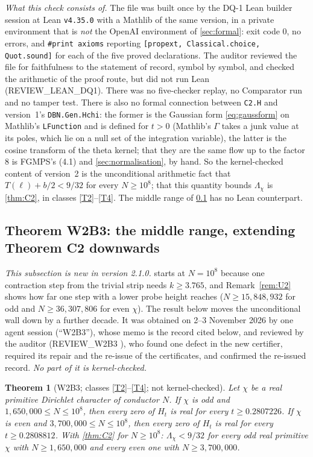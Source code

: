 \documentclass[11pt]{article}
\newtheorem{theorem}{Theorem}[section]
\theoremstyle{definition}
\newcommand{\lean}[1]{\texttt{#1}}
\newcommand{\Lc}{\Lambda}
\begin{document}
\emph{What this check consists of.} The file was built once by the DQ-1 Lean builder session at Lean \lean{v4.35.0} with a Mathlib of the same version, in a private environment that is \emph{not} the OpenAI environment of \cref{sec:formal}: exit code $0$, no errors, and \lean{\#print axioms} reporting \lean{[propext, Classical.choice, Quot.sound]} for each of the five proved declarations. The auditor reviewed the file for faithfulness to the statement of record, symbol by symbol, and checked the arithmetic of the proof route, but did not run Lean (REVIEW\_LEAN\_DQ1). There was no five-checker replay, no Comparator run and no tamper test. There is also no formal connection between \lean{C2.H} and version~1's \lean{DBN.Gen.Hchi}: the former is the Gaussian form \eqref{eq:gaussform} on Mathlib's \lean{LFunction} and is defined for $t > 0$ (Mathlib's $\Gamma$ takes a junk value at its poles, which lie on a null set of the integration variable), the latter is the cosine transform of the theta kernel; that they are the same flow up to the factor $8$ is FGMPS's (4.1) and \cref{sec:normalisation}, by hand. So the kernel-checked content of version~2 is the unconditional arithmetic fact that $T(\ell) + b/2 < 9/32$ for every $N \ge 10^8$; that this quantity bounds $\Lc_\chi$ is \cref{thm:C2}, in classes \ref{T2}--\ref{T4}. The middle range of \cref{sec:W2B3} has no Lean counterpart.

\subsection{Theorem W2B3: the middle range, extending Theorem C2 downwards}\label{sec:W2B3}

\emph{This subsection is new in version 2.1.0.}  starts at $N = 10^8$ because one contraction step from the trivial strip needs $k \ge 3.765$, and Remark~\ref{rem:U2} shows how far one step with a lower probe height reaches ($N \ge 15{,}848{,}932$ for odd and $N \ge 36{,}307{,}806$ for even $\chi$). The result below moves the unconditional wall down by a further decade. It was obtained on 2--3 November 2026 by one agent session (``W2B3''), whose memo is the record cited below, and reviewed by the auditor (REVIEW\_W2B3 \cite{dq1records}), who found one defect in the new certifier, required its repair and the re-issue of the certificates, and confirmed the re-issued record. \emph{No part of it is kernel-checked.}

\begin{theorem}[W2B3; classes \ref{T2}--\ref{T4}; not kernel-checked]\label{thm:W2B3}
Let $\chi$ be a real primitive Dirichlet character of conductor $N$. If $\chi$ is odd and $1{,}650{,}000 \le N \le 10^8$, then every zero of $H_t$ is real for every $t \ge 0.2807226$. If $\chi$ is even and $3{,}700{,}000 \le N \le 10^8$, then every zero of $H_t$ is real for every $t \ge 0.2808812$. With \cref{thm:C2} for $N \ge 10^8$: $\Lc_\chi < 9/32$ for every odd real primitive $\chi$ with $N \ge 1{,}650{,}000$ and every even one with $N \ge 3{,}700{,}000$.
\end{theorem}
\end{document}
